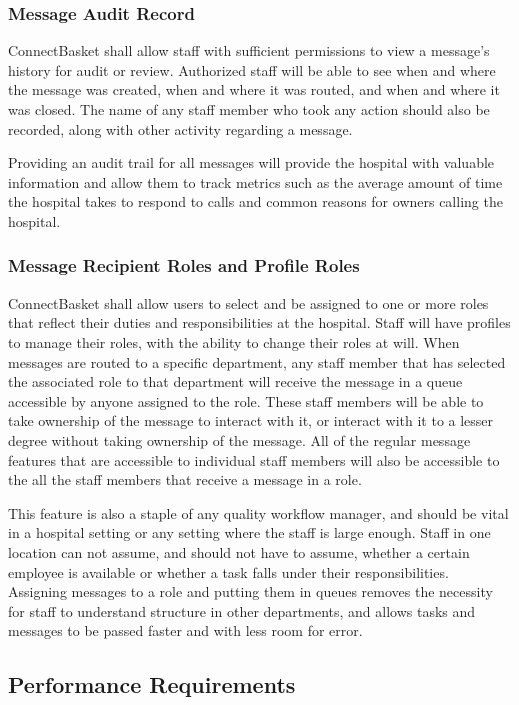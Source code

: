 \documentclass[onecolumn, draftclsnofoot,10pt, compsoc]{IEEEtran}
\begin{document}
\subsubsection{Message Audit Record}
ConnectBasket shall allow staff with sufficient permissions to view a message's  history for audit or review. Authorized staff will  be able to see when and where the message was created, when and where it was routed, and when and where it was closed. The name of any staff member who took any action should also be recorded, along with other activity regarding a message. 

Providing an audit trail for all messages will provide the hospital with valuable information and allow them to track metrics such as the average amount of time the hospital takes to respond to calls and common reasons for owners calling the hospital. 

\subsubsection{Message Recipient Roles and Profile Roles}
ConnectBasket shall allow users to select and be assigned to one or more roles that reflect their duties and responsibilities at the hospital. Staff will have profiles to manage their roles, with the ability to change their roles at will. When messages are routed to a specific department, any staff member that has selected the associated role to that department will receive the message in a queue accessible by anyone assigned to the role. These staff members will be able to take ownership of the message to interact with it, or interact with it to a lesser degree without taking ownership of the message. All of the regular message features that are accessible to individual staff members will also be accessible to the all the staff members that receive a message in a role. 

This feature is also a staple of any quality workflow manager, and should be vital in a hospital setting or any setting where the staff is large enough. Staff in one location can not assume, and should not have to assume, whether a certain employee is available or whether a task falls under their responsibilities. Assigning messages to a role and putting them in queues removes the necessity for staff to understand structure in other departments, and allows tasks and messages to be passed faster and with less room for error.

\subsection{Performance Requirements}
\end{document}
